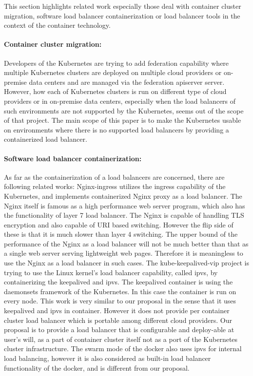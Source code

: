 This section highlights related work especially those deal with container cluster migration, 
software load balancer containerization or load balancer tools in the context of the container technology.

\paragraph{\bf Container cluster migration:}

Developers of the Kubernetes are trying to add federation\cite{K8sFederation2017} capability 
where multiple Kubernetes clusters are deployed on multiple cloud providers or on-premise data centers 
and are managed via the federation apiserver server. However, how each of Kubernetes clusters is run on different type of cloud providers
or in on-premise data centers, especially when the load balancers of such environments are not supported by the Kubernetes, 
seems out of the scope of that project. 
The main scope of this paper is to make the Kubernetes usable on environments where there is no supported load balancers
by providing a containerized load balancer.

\paragraph{\bf Software load balancer containerization:}
As far as the containerization of a load balancers are concerned, there are following related works:
Nginx-ingress\cite{Pleshakov2016,NginxInc2016} utilizes the ingress\cite{K8sIngress2017} capability of the Kubernetes, 
and implements containerized Nginx proxy as a load balancer. The Nginx itself is famous as a high performance web server program,
which also has the functionality of layer 7 load balancer. The Nginx is capable of handling TLS encryption and also capable of  
URI based switching. However the flip side of these is that it is much slower than layer 4 switching.
The upper bound of the performance of the Nginx as a load balancer will not be much better than 
that as a single web server serving lightweight web pages. 
Therefore it is meaningless to use the Nginx as a load balancer in such cases.
The kube-keepalived-vip\cite{Prashanth2016} project is trying to use the Linux kernel's load balancer capability, 
called ipvs\cite{Zhang2000}, by containerizing the keepalived\cite{ACassen2016} and ipvs. 
The keepalived container is using the daemonsets\cite{K8sDaemonsets2017} framework of the Kubernetes. 
In this case the container is run on every node.
This work is very similar to our proposal in the sense that it uses keepalived and ipvs in container. 
However it does not provide per container cluster load balancer which is portable among different cloud providers.   
Our proposal is to provide a load balancer that is configurable and deploy-able at user's will,
 as a part of container cluster itself not as a port of the Kubernetes cluster infrastructure.  
The swarm mode of the docker\cite{DockerCoreEngineering2016,DockerInc2017} also uses ipvs for internal load balancing,
however it is also considered as built-in load balancer functionality of the docker, 
and is different from our proposal.

